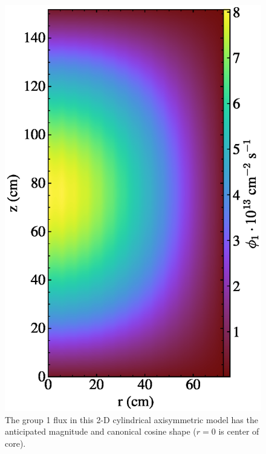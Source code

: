 \documentclass{article}
\begin{document}
\begin{figure}[htpb]
  \centering
  \includegraphics{2d_gamma_heating_group1.eps}
        \caption{The group 1 flux in this 2-D cylindrical axisymmetric model
        has the anticipated magnitude and canonical cosine shape ($r=0$ is center of core). }
  \label{fig:group1}
\end{figure}
\end{document}
